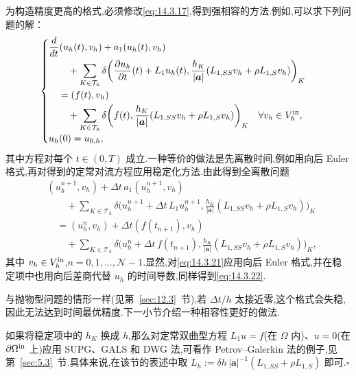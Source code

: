 为构造精度更高的格式,必须修改\eqref{eq:14.3.17},得到强相容的方法.例如,可以求下列问题的解：
\begin{equation}\label{eq:14.3.21}
  \begin{cases}
    \begin{aligned}
      &\dfrac{d}{dt}(u_h(t),v_h)+a_1(u_h(t),v_h)\\
      &\qquad+\displaystyle\sum_{K\in\mathcal T_h}\delta
         \biggl(\dfrac{\partial u_h}{\partial t}(t)+L_1u_h(t),
                  \dfrac{h_K}{|\boldsymbol{a}|}(L_{1,SS}v_h+\rho L_{1,S}v_h)\biggr)_K\\
      &\quad=(f(t),v_h)\\
      &\qquad+\displaystyle\sum_{K\in\mathcal T_h}\delta
         \biggl(f(t),\dfrac{h_K}{|\boldsymbol{a}|}(L_{1,SS}v_h+\rho L_{1,S}v_h)\biggr)_K
          \quad\forall v_h\in V_h^{\rm in},
    \end{aligned}\\[2pt]
    u_h(0)=u_{0,h},
  \end{cases}
\end{equation}
其中方程对每个 \(t\in(0,T)\) 成立.一种等价的做法是先离散时间,例如用向后 Euler 格式,再对得到的定常对流方程应用稳定化方法.由此得到全离散问题
\begin{equation}\label{eq:14.3.22}
  \begin{aligned}
    &(u_h^{n+1},v_h)+\Delta t\,a_1(u_h^{n+1},v_h)\\
    &\qquad+\sum_{K\in\mathcal T_h}\delta
        \biggl(u_h^{n+1}+\Delta t\,L_1u_h^{n+1},
            \frac{h_K}{|\boldsymbol{a}|}(L_{1,SS}v_h+\rho L_{1,S}v_h)\biggr)_K\\
    &\quad=(u_h^n,v_h)+\Delta t(f(t_{n+1}),v_h)\\
    &\qquad+\sum_{K\in\mathcal T_h}\delta
        \biggl(u_h^n+\Delta t\,f(t_{n+1}),
            \frac{h_K}{|\boldsymbol{a}|}(L_{1,SS}v_h+\rho L_{1,S}v_h)\biggr)_K,
  \end{aligned}
\end{equation}
其中 \(v_h\in V_h^{\rm in}\),\(n=0,1,\ldots,\mathcal N-1\).显然,对\eqref{eq:14.3.21}应用向后 Euler 格式,并在稳定项中也用向后差商代替 \(u_h\) 的时间导数,同样得到\eqref{eq:14.3.22}.

与抛物型问题的情形一样(见第~\ref{sec:12.3}~节),若 \(\Delta t/h\) 太接近零,这个格式会失稳,因此无法达到时间最优精度.下一小节介绍一种相容性更好的做法.

\begin{note}
如果将稳定项中的 \(h_K\) 换成 \(h\),那么对定常双曲型方程 \(L_1u=f\)(在 \(\Omega\) 内)、\(u=0\)(在 \(\partial\Omega^{\rm in}\) 上)应用 SUPG、GALS 和 DWG 法,可看作 Petrov--Galerkin 法的例子,见第~\ref{sec:5.3}~节.具体来说,在该节的表述中取 \(L_h:=\delta h\,|\boldsymbol{a}|^{-1}(L_{1,SS}+\rho L_{1,S})\) 即可.\hfill\(\square\)
\end{note}

